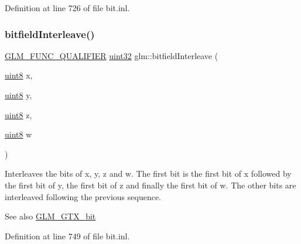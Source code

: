Definition at line 726 of file bit.\+inl.

\mbox{\label{group__gtx__bit_ga447c0bbed9d60c14578626d8f03f3755}} 
\subsubsection{\texorpdfstring{bitfield\+Interleave()}{bitfieldInterleave()}\hspace{0.1cm}{\footnotesize\ttfamily [14/16]}}
{\footnotesize\ttfamily \hyperlink{setup_8hpp_a33fdea6f91c5f834105f7415e2a64407}{G\+L\+M\+\_\+\+F\+U\+N\+C\+\_\+\+Q\+U\+A\+L\+I\+F\+I\+ER} \hyperlink{group__gtc__type__precision_ga202b6a53c105fcb7e531f9b443518451}{uint32} glm\+::bitfield\+Interleave (\begin{DoxyParamCaption}\item[{\hyperlink{group__gtc__type__precision_ga1a7dcd8aac97cc8020817c94049deff2}{uint8}}]{x,  }\item[{\hyperlink{group__gtc__type__precision_ga1a7dcd8aac97cc8020817c94049deff2}{uint8}}]{y,  }\item[{\hyperlink{group__gtc__type__precision_ga1a7dcd8aac97cc8020817c94049deff2}{uint8}}]{z,  }\item[{\hyperlink{group__gtc__type__precision_ga1a7dcd8aac97cc8020817c94049deff2}{uint8}}]{w }\end{DoxyParamCaption})}

Interleaves the bits of x, y, z and w. The first bit is the first bit of x followed by the first bit of y, the first bit of z and finally the first bit of w. The other bits are interleaved following the previous sequence.

\begin{DoxySeeAlso}{See also}
\hyperlink{group__gtx__bit}{G\+L\+M\+\_\+\+G\+T\+X\+\_\+bit} 
\end{DoxySeeAlso}


Definition at line 749 of file bit.\+inl.

\mbox{\label{group__gtx__bit_ga09ee0be0fac790a1607a711e597dd9bf}} 

